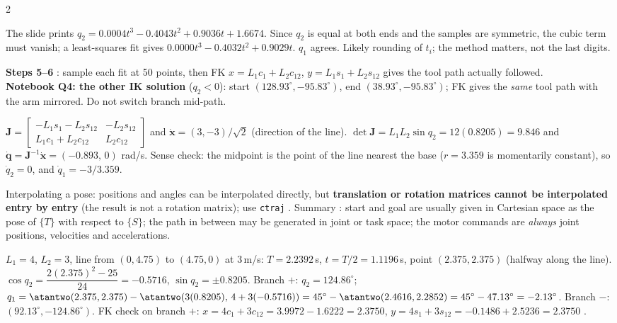 \begin{multicols}{2}
\begin{slideerr}[slide p.\,59]
The slide prints $q_2=0.0004t^3-0.4043t^2+0.9036t+1.6674$. Since $q_2$ is equal at both ends and the samples are symmetric, the cubic term must vanish; a least-squares fit gives $0.0000t^3-0.4032t^2+0.9029t$. $q_1$ agrees. Likely rounding of $t_i$; the method matters, not the last digits.
\end{slideerr}
\textbf{Steps 5--6} : sample each fit at 50 points, then FK $x=L_1c_1+L_2c_{12}$, $y=L_1s_1+L_2s_{12}$ gives the tool path actually followed.\\
\textbf{Notebook Q4: the other IK solution} ($q_2<0$): start $(128.93^\circ,-95.83^\circ)$, end $(38.93^\circ,-95.83^\circ)$; FK gives the \emph{same} tool path with the arm mirrored. Do not switch branch mid-path. \chk
\begin{worked}
$\mathbf J=\begin{bmatrix}-L_1s_1-L_2s_{12}&-L_2s_{12}\\L_1c_1+L_2c_{12}&L_2c_{12}\end{bmatrix}$ and $\dot{\mathbf x}=(3,-3)/\sqrt2$ (direction of the line). $\det\mathbf J=L_1L_2\sin q_2=12(0.8205)=9.846$ and $\dot{\mathbf q}=\mathbf J^{-1}\dot{\mathbf x}=(-0.893,\,0)$ rad/s. Sense check: the midpoint is the point of the line nearest the base ($r=3.359$ is momentarily constant), so $\dot q_2=0$, and $\dot q_1=-3/3.359$. \chk
\end{worked}
\nopagebreak[4]
Interpolating a pose: positions and angles can be interpolated directly, but \textbf{translation or rotation matrices cannot be interpolated entry by entry} (the result is not a rotation matrix); use \texttt{ctraj} . Summary : start and goal are usually given in Cartesian space as the pose of $\{T\}$ with respect to $\{S\}$; the path in between may be generated in joint or task space; the motor commands are \emph{always} joint positions, velocities and accelerations.

\nopagebreak[4]
\begin{worked}[RR tool on a straight line: joint angles at $t=T/2$ (slide example)]
$L_1=4$, $L_2=3$, line from $(0,4.75)$ to $(4.75,0)$ at $3$\,m/s: $T=2.2392$\,s, $t=T/2=1.1196$\,s, point $(2.375,2.375)$ (halfway along the line).\\
$\cos q_2=\dfrac{2(2.375)^2-25}{24}=-0.5716$, $\sin q_2=\pm0.8205$. Branch $+$: $q_2=124.86^\circ$; $q_1=\atantwo(2.375,2.375)-\atantwo(3(0.8205),\,4+3(-0.5716))=45^\circ-\atantwo(2.4616,2.2852)=45^\circ-47.13^\circ=-2.13^\circ$. Branch $-$: $(92.13^\circ,-124.86^\circ)$. FK check on branch $+$: $x=4c_1+3c_{12}=3.9972-1.6222=2.3750$, $y=4s_1+3s_{12}=-0.1486+2.5236=2.3750$ \checkmark. \chk
\end{worked}


\end{multicols}

